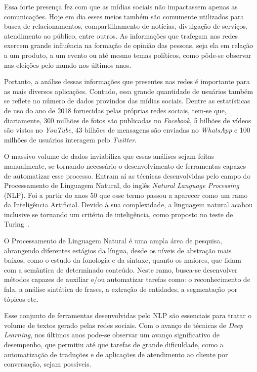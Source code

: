 Essa forte presença fez com que as mídias sociais não impactassem apenas as
comunicações.
Hoje em dia esses meios também são comumente utilizados para busca de
relacionamentos, compartilhamento de notícias, divulgação de serviços,
atendimento ao público, entre outros.
As informações que trafegam nas redes exercem grande influência na formação de
opinião das pessoas, seja ela em relação a um produto, a um evento ou até mesmo
temas políticos, como pôde-se observar nas eleições pelo mundo nos últimos anos.

Portanto, a análise dessas informações que presentes nas redes é importante para
as mais diversos aplicações.
Contudo, essa grande quantidade de usuários também se reflete no número de dados
provindos das mídias sociais.
Dentre as estatísticas de uso do ano de 2018 fornecidas pelas próprias redes
sociais, tem-se que, diariamente, 300 milhões de fotos são publicadas no
\textit{Facebook}, 5 bilhões de vídeos são vistos no \textit{YouTube}, 43
bilhões de mensagens são enviadas no \textit{WhatsApp} e 100 milhões de usuários
interagem pelo \textit{Twitter}.

O massivo volume de dados inviabiliza que essas análises sejam feitas
manualmente, se tornando necessário o desenvolvimento de ferramentas capazes de
automatizar esse processo.
Entram aí as técnicas desenvolvidas pelo campo do Processamento de Linguagem
Natural, do inglês \textit{Natural Language Processing} (NLP).
Foi a partir do anos 50 que esse termo passou a aparecer como um ramo da
Inteligência Artificial.
Devido à sua complexidade, a linguagem natural acabou inclusive se tornando um
critério de inteligência, como proposto no teste de Turing~\cite{turing50}.

O Processamento de Linguagem Natural é uma ampla área de pesquisa, abrangendo
diferentes estágios da língua, desde os níveis de abstração mais baixos, como o
estudo da fonologia e da sintaxe, quanto os maiores, que lidam com a semântica
de determinado conteúdo.
Neste ramo, busca-se desenvolver métodos capazes de auxiliar e/ou automatizar
tarefas como: o reconhecimento de fala, a análise sintática de frases, a
extração de entidades, a segmentação por tópicos etc.

Esse conjunto de ferramentas desenvolvidas pelo NLP são essenciais para tratar
o volume de textos gerado pelas redes sociais.
Com o avanço de técnicas de \textit{Deep Learning}, nos últimos anos pode-se
observar um avanço significativo de desempenho, que permitiu até que tarefas
de grande dificuldade, como a automatização de traduções e de aplicações de
atendimento ao cliente por conversação, sejam possíveis.

